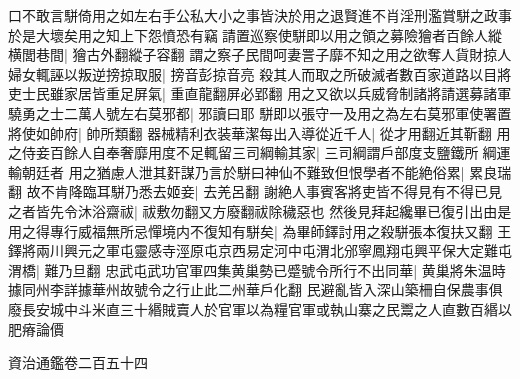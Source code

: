口不敢言駢倚用之如左右手公私大小之事皆決於用之退賢進不肖淫刑濫賞駢之政事於是大壞矣用之知上下怨憤恐有竊請置巡察使駢即以用之領之募險獪者百餘人縱横閭巷間|{
	獪古外翻縱子容翻}
謂之察子民間呵妻詈子靡不知之用之欲奪人貨財掠人婦女輒誣以叛逆搒掠取服|{
	搒音彭掠音亮}
殺其人而取之所破滅者數百家道路以目將吏士民雖家居皆重足屏氣|{
	重直龍翻屏必郢翻}
用之又欲以兵威脅制諸將請選募諸軍驍勇之士二萬人號左右莫邪都|{
	邪讀曰耶}
駢即以張守一及用之為左右莫邪軍使署置將使如帥府|{
	帥所類翻}
器械精利衣装華潔每出入導從近千人|{
	從才用翻近其靳翻}
用之侍妾百餘人自奉奢靡用度不足輒留三司綱輸其家|{
	三司綱謂戶部度支鹽鐵所綱運輸朝廷者}
用之猶慮人泄其姧謀乃言於駢曰神仙不難致但恨學者不能絶俗累|{
	累良瑞翻}
故不肯降臨耳駢乃悉去姬妾|{
	去羌呂翻}
謝絶人事賓客將吏皆不得見有不得已見之者皆先令沐浴齋祓|{
	祓敷勿翻又方廢翻祓除穢惡也}
然後見拜起纔畢已復引出由是用之得專行威福無所忌憚境内不復知有駢矣|{
	為畢師鐸討用之殺駢張本復扶又翻}
王鐸將兩川興元之軍屯靈感寺涇原屯京西易定河中屯渭北邠寧鳳翔屯興平保大定難屯渭橋|{
	難乃旦翻}
忠武屯武功官軍四集黄巢勢已蹙號令所行不出同華|{
	黄巢將朱温時據同州李詳據華州故號令之行止此二州華戶化翻}
民避亂皆入深山築柵自保農事俱廢長安城中斗米直三十緡賊賣人於官軍以為糧官軍或執山寨之民鬻之人直數百緡以肥瘠論價

資治通鑑卷二百五十四
